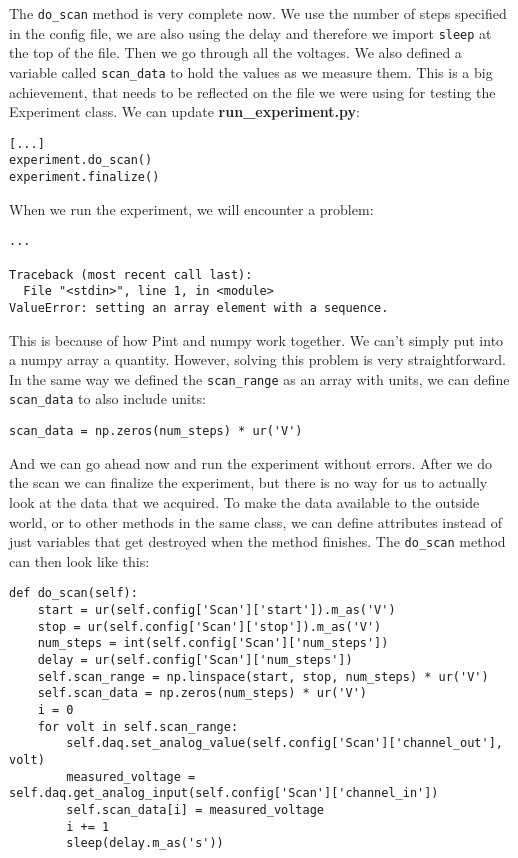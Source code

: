 The \texttt{do\_scan} method is very complete now. We use the number of steps specified in the config file, we are also using the delay and therefore we import \texttt{sleep} at the top of the file. Then we go through all the voltages. We also defined a variable called \texttt{scan\_data} to hold the values as we measure them. This is a big achievement, that needs to be reflected on the file we were using for testing the Experiment class. We can update \textbf{run\_experiment.py}:

\begin{verbatim}
[...]
experiment.do_scan()
experiment.finalize()
\end{verbatim}

When we run the experiment, we will encounter a problem:

\begin{verbatim}
...

Traceback (most recent call last):
  File "<stdin>", line 1, in <module>
ValueError: setting an array element with a sequence.
\end{verbatim}

This is because of how Pint and numpy work together. We can't simply put into a numpy array a quantity. However, solving this problem is very straightforward. In the same way we defined the \texttt{scan\_range} as an array with units, we can define \texttt{scan\_data} to also include units:

\begin{verbatim}
scan_data = np.zeros(num_steps) * ur('V')
\end{verbatim}

And we can go ahead now and run the experiment without errors. After we do the scan we can finalize the experiment, but there is no way for us to actually look at the data that we acquired. To make the data available to the outside world, or to other methods in the same class, we can define attributes instead of just variables that get destroyed when the method finishes. The \texttt{do\_scan} method can then look like this:

\begin{verbatim}
def do_scan(self):
    start = ur(self.config['Scan']['start']).m_as('V')
    stop = ur(self.config['Scan']['stop']).m_as('V')
    num_steps = int(self.config['Scan']['num_steps'])
    delay = ur(self.config['Scan']['num_steps'])
    self.scan_range = np.linspace(start, stop, num_steps) * ur('V')
    self.scan_data = np.zeros(num_steps) * ur('V')
    i = 0
    for volt in self.scan_range:
        self.daq.set_analog_value(self.config['Scan']['channel_out'], volt)
        measured_voltage = self.daq.get_analog_input(self.config['Scan']['channel_in'])
        self.scan_data[i] = measured_voltage
        i += 1
        sleep(delay.m_as('s'))
\end{verbatim}

